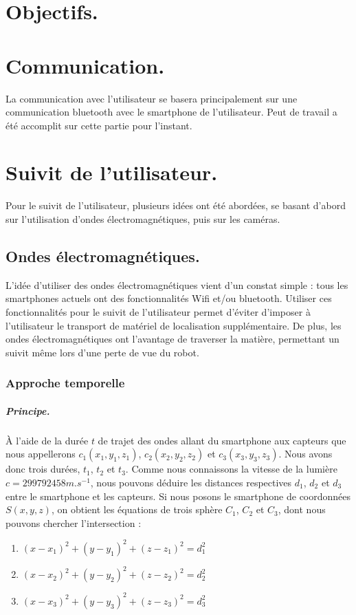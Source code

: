\chapter{Objectifs.}

\chapter{Communication.}
La communication avec l'utilisateur se basera principalement sur une communication bluetooth avec le smartphone de l'utilisateur. Peut de travail a été accomplit sur cette partie pour l'instant.

\chapter{Suivit de l'utilisateur.}
Pour le suivit de l'utilisateur, plusieurs idées ont été abordées, se basant d'abord sur l'utilisation d'ondes électromagnétiques, puis sur les caméras.

\section{Ondes électromagnétiques.}
L'idée d'utiliser des ondes électromagnétiques vient d'un constat simple : tous les smartphones actuels ont des fonctionnalités Wifi et/ou bluetooth. Utiliser ces fonctionnalités pour le suivit de l'utilisateur permet d'éviter d'imposer à l'utilisateur le transport de matériel de localisation supplémentaire. De plus, les ondes électromagnétiques ont l'avantage de traverser la matière, permettant un suivit même lors d'une perte de vue du robot.

\subsection{Approche temporelle}
\paragraph{Principe.}
À l'aide de la durée $t$ de trajet des ondes allant du smartphone aux capteurs que nous appellerons $c_1(x_1,y_1,z_1)$, $c_2(x_2,y_2,z_2)$ et $c_3(x_3,y_3,z_3)$. Nous avons donc trois durées, $t_1$, $t_2$ et $t_3$. Comme nous connaissons la vitesse de la lumière $c=299792458m.s^{-1}$, nous pouvons déduire les distances respectives $d_1$, $d_2$ et $d_3$ entre le smartphone et les capteurs. Si nous posons le smartphone de coordonnées $S(x,y,z)$, on obtient les équations de trois sphère $C_1$, $C_2$ et $C_3$, dont nous pouvons chercher l'intersection :
\begin{enumerate}
    \item $(x-x_1)^2 + (y-y_1)^2 + (z-z_1)^2 = d_1^2$
    \item $(x-x_2)^2 + (y-y_2)^2 + (z-z_2)^2 = d_2^2$
    \item $(x-x_3)^2 + (y-y_3)^2 + (z-z_3)^2 = d_3^2$
\end{enumerate}

